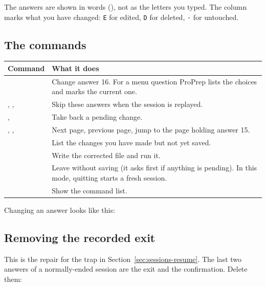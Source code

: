 The answers are shown in words (), not as the
letters you typed. The  column marks what you have changed:
\texttt{E} for edited, \texttt{D} for deleted, \texttt{·} for untouched.

\subsection{The commands}

\begin{tabularx}{\linewidth}{@{}lL@{}}
\toprule
\textbf{Command} & \textbf{What it does} \\
\midrule
{} & Change answer 16. For a menu question ProPrep lists the
  choices and marks the current one. \\
, ,  & Skip these answers when the
  session is replayed. \\
,  & Take back a pending change. \\
, ,  & Next page, previous page, jump to the
  page holding answer 15. \\
 & List the changes you have made but not yet saved. \\
 & Write the corrected file and run it. \\
 & Leave without saving (it asks first if anything is pending).
  In this mode, quitting starts a fresh session. \\
 & Show the command list. \\
\bottomrule
\end{tabularx}

\medskip
Changing an answer looks like this:


\subsection{Removing the recorded exit}

This is the repair for the trap in Section~\ref{sec:sessions-resume}. The last
two answers of a normally-ended session are the exit and the confirmation.
Delete them:


